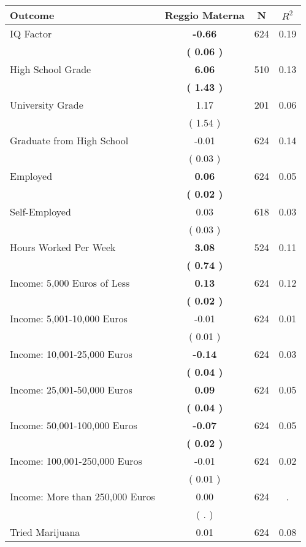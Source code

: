 \begin{tabular}{lccc}
\toprule
 \textbf{Outcome} & \textbf{Reggio Materna} & \textbf{N} & \textbf{$ R^2$} \\
\midrule
IQ Factor & \textbf{    -0.66} & 624 &      0.19 \\ 
 & \textbf{(     0.06 )} & \\
High School Grade & \textbf{     6.06} & 510 &      0.13 \\ 
 & \textbf{(     1.43 )} & \\
University Grade &      1.17 & 201 &      0.06 \\ 
 & (     1.54 ) & \\
Graduate from High School &     -0.01 & 624 &      0.14 \\ 
 & (     0.03 ) & \\
Employed & \textbf{     0.06} & 624 &      0.05 \\ 
 & \textbf{(     0.02 )} & \\
Self-Employed &      0.03 & 618 &      0.03 \\ 
 & (     0.03 ) & \\
Hours Worked Per Week & \textbf{     3.08} & 524 &      0.11 \\ 
 & \textbf{(     0.74 )} & \\
Income: 5,000 Euros of Less & \textbf{     0.13} & 624 &      0.12 \\ 
 & \textbf{(     0.02 )} & \\
Income: 5,001-10,000 Euros &     -0.01 & 624 &      0.01 \\ 
 & (     0.01 ) & \\
Income: 10,001-25,000 Euros & \textbf{    -0.14} & 624 &      0.03 \\ 
 & \textbf{(     0.04 )} & \\
Income: 25,001-50,000 Euros & \textbf{     0.09} & 624 &      0.05 \\ 
 & \textbf{(     0.04 )} & \\
Income: 50,001-100,000 Euros & \textbf{    -0.07} & 624 &      0.05 \\ 
 & \textbf{(     0.02 )} & \\
Income: 100,001-250,000 Euros &     -0.01 & 624 &      0.02 \\ 
 & (     0.01 ) & \\
Income: More than 250,000 Euros &      0.00 & 624 &         . \\ 
 & (        . ) & \\
Tried Marijuana &      0.01 & 624 &      0.08 \\ 

\end{tabular}
